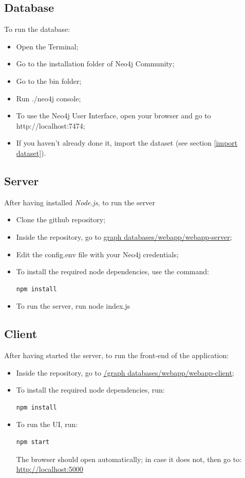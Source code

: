 \documentclass{article}
\begin{document}
\subsection{Database}
To run the database:
\begin{itemize}
    \item Open the Terminal;
    \item Go to the installation folder of Neo4j Community;
    \item Go to the bin folder;
    \item Run ./neo4j console;
    \item To use the Neo4j User Interface, open your browser and go to http://localhost:7474;
    \item If you haven't already done it, import the dataset (see section \ref{import dataset}).
\end{itemize}
\subsection{Server}
After having installed \textit{Node.js}, to run the server
\begin{itemize}
    \item Clone the github repository;
    \item Inside the repository, go to \href{https://github.com/filippolazzati/smbud/tree/main/graph\%20databases/webapp/webapp-server}{graph databases/webapp/webapp-server};
    \item Edit the config.env file with your Neo4j credentials;
    \item To install the required node dependencies, use the command:
    \begin{lstlisting}[language=bash]
    npm install
\end{lstlisting}
    \item To run the server, run node index.js
\end{itemize}
\subsection{Client}
After having started the server, to run the front-end of the application:
\begin{itemize}
    \item Inside the repository, go to \href{https://github.com/filippolazzati/smbud/tree/main/graph\%20databases/webapp/webapp-client}{/graph databases/webapp/webapp-client};
    \item To install the required node dependencies, run: 
    \begin{lstlisting}[language=bash]
    npm install
\end{lstlisting}
    \item To run the UI, run:
    \begin{lstlisting}[language=bash]
    npm start
\end{lstlisting} The browser should open automatically; in case it does not, then go to: \url{http://localhost:5000}
\end{itemize}
\end{document}
